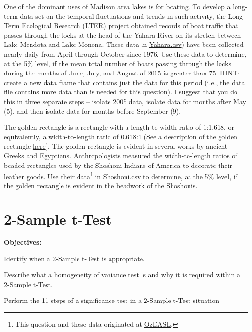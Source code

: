 \documentclass[10pt,openany]{book}\usepackage[]{graphicx}\usepackage[]{color}
\begin{document}
\begin{exsection}
  \item \label{revex:tTestYahara1} \rhw{} One of the dominant uses of Madison area lakes is for boating.  To develop a long-term data set on the temporal fluctuations and trends in such activity, the Long Term Ecological Research (LTER) project obtained records of boat traffic that passes through the locks at the head of the Yahara River on its stretch between Lake Mendota and Lake Monona.  These data in \href{https://raw.githubusercontent.com/droglenc/NCData/master/Yahara.csv}{Yahara.csv}) have been collected nearly daily from April through October since 1976.  Use these data to determine, at the 5\% level, if the mean total number of boats passing through the locks during the months of June, July, and August of 2005 is greater than 75.  HINT: create a new data frame that contains just the data for this period (i.e., the data file contains more data than is needed for this question).  I suggest that you do this in three separate steps -- isolate 2005 data, isolate data for months after May (5), and then isolate data for months before September (9). 

  \item \label{revex:tTestBeads} \rhw{} The golden rectangle is a rectangle with a length-to-width ratio of 1:1.618, or equivalently, a width-to-length ratio of 0.618:1 (See a description of the golden rectangle \href{http://en.wikipedia.org/wiki/Golden_rectangle}{here}).  The golden rectangle is evident in several works by ancient Greeks and Egyptians.  Anthropologists measured the width-to-length ratios of beaded rectangles used by the Shoshoni Indians of America to decorate their leather goods.  Use their data\footnote{This question and these data originated at \href{http://www.statsci.org/data/general/shoshoni.html}{OzDASL}.} in \href{https://raw.githubusercontent.com/droglenc/NCData/master/Shoshoni.csv}{Shoshoni.csv} to determine, at the 5\% level, if the golden rectangle is evident in the beadwork of the Shoshonis. 

\end{exsection}



\chapter{2-Sample t-Test} \label{chap:tTest2}
\begin{ChapObj}{\boxwidth}
  \textbf{Objectives:}
  \begin{Enumerate}
    \item Identify when a 2-Sample t-Test is appropriate.
    \item Describe what a homogeneity of variance test is and why it is required within a 2-Sample t-Test.
    \item Perform the 11 steps of a significance test in a 2-Sample t-Test situation.
  \end{Enumerate}
\end{ChapObj}
\end{document}
